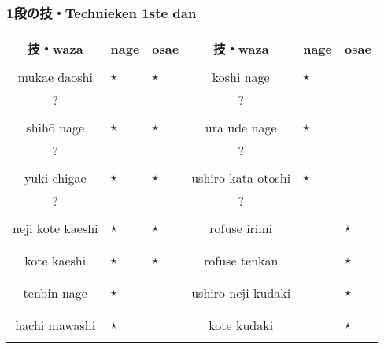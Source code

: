 \subsubsection{1段の技・Technieken 1ste dan}
\begin{table}[H]
\begin{center}
\begin{tabular}{c|L|L|c|L|L}
    {\bfseries 技・waza} & {\bfseries nage} & {\bfseries osae} & {\bfseries 技・waza} & {\bfseries nage} & {\bfseries osae}\\
    \hline
    \ruby{}{}\ruby{}{} &  &  & \ruby{}{}\ruby{}{} &  & \\
    mukae daoshi & $\star$ & $\star$ & koshi nage & $\star$ & \\
    ? &  &  & ? &  & \\
    \ruby{}{}\ruby{}{} &  &  & \ruby{}{}\ruby{}{} &  & \\
    shih\={o} nage & $\star$ & $\star$ & ura ude nage & $\star$ & \\
    ? &  &  & ? &  & \\
    \ruby{}{}\ruby{}{} &  &  & \ruby{}{}\ruby{}{} &  & \\
    yuki chigae & $\star$ & $\star$ & ushiro kata otoshi & $\star$ & \\
    ? &  &  & ? &  & \\
    \ruby{}{} &  &  & \ruby{}{}\ruby{}{} &  & \\
    neji kote kaeshi & $\star$ & $\star$ & rofuse irimi &  & $\star$\\
     &  &  &  &  & \\
    \ruby{}{} &  &  & \ruby{}{} &  & \\
    kote kaeshi & $\star$ & $\star$ & rofuse tenkan &  & $\star$\\
     &  &  &  &  & \\
    \ruby{}{}\ruby{}{} &  &  & \ruby{}{}\ruby{}{} &  & \\
    tenbin nage & $\star$ &  & ushiro neji kudaki &  & $\star$\\
     &  &  &  &  & \\
    \ruby{}{}\ruby{}{} &  &  & \ruby{}{} &  & \\
    hachi mawashi & $\star$ &  & kote kudaki &  & $\star$\\
     &  &  &  & 
\end{tabular}
\end{center}
\label{dan_1_kihonnagewaza}
\end{table}

